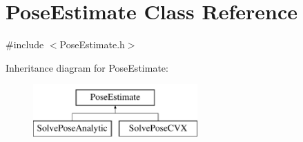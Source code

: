 \hypertarget{classPoseEstimate}{\section{\-Pose\-Estimate \-Class \-Reference}
\label{classPoseEstimate}
}


{\ttfamily \#include $<$\-Pose\-Estimate.\-h$>$}

\-Inheritance diagram for \-Pose\-Estimate\-:\begin{figure}[H]
\begin{center}
\leavevmode
\includegraphics[height=2.000000cm]{classPoseEstimate}
\end{center}
\end{figure}
